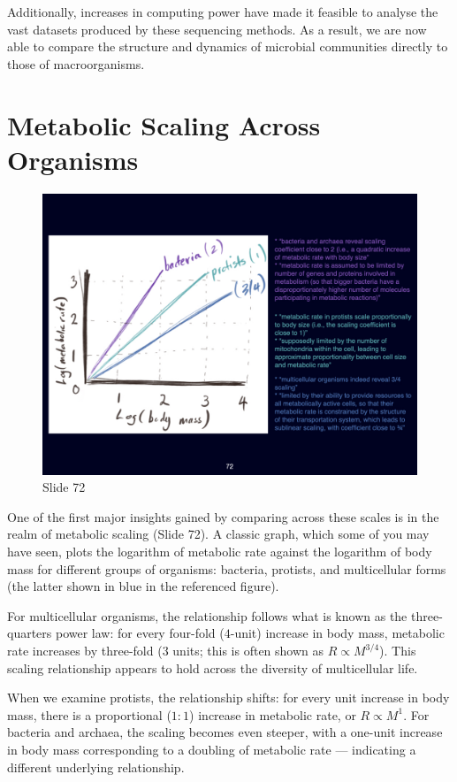 \documentclass[
  10pt,
]{book}
\begin{document}
Additionally, increases in computing power have made it feasible to
analyse the vast datasets produced by these sequencing methods. As a
result, we are now able to compare the structure and dynamics of
microbial communities directly to those of macroorganisms.

\section{Metabolic Scaling Across
Organisms}\label{metabolic-scaling-across-organisms}

\begin{figure}[ht]
\centering
\includegraphics[width=0.8\linewidth]{../images/BDC334/BDC334-072.jpeg}
\caption*{Slide 72}
\end{figure}

One of the first major insights gained by comparing across these scales
is in the realm of metabolic scaling (Slide 72). A classic graph, which
some of you may have seen, plots the logarithm of metabolic rate against
the logarithm of body mass for different groups of organisms: bacteria,
protists, and multicellular forms (the latter shown in blue in the
referenced figure).

For multicellular organisms, the relationship follows what is known as
the three-quarters power law: for every four-fold (\(4\)-unit) increase
in body mass, metabolic rate increases by three-fold (\(3\) units; this
is often shown as \(R \propto M^{3/4}\)). This scaling relationship
appears to hold across the diversity of multicellular life.

When we examine protists, the relationship shifts: for every unit
increase in body mass, there is a proportional (\(1:1\)) increase in
metabolic rate, or \(R \propto M^1\). For bacteria and archaea, the
scaling becomes even steeper, with a one-unit increase in body mass
corresponding to a doubling of metabolic rate --- indicating a different
underlying relationship.
\end{document}
